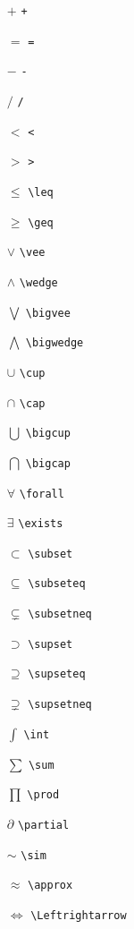 \begin{multicols}{3}
\begin{itemize}
\item[$+$] \texttt{+}
\item[$=$] \texttt{=}
\item[$-$] \texttt{-}
\item[$/$] \texttt{/}
\item[$<$] \texttt{<}
\item[$>$] \texttt{>}
\item[$\leq$] \texttt{\textbackslash leq}
\item[$\geq $] \texttt{\textbackslash geq}
\item[$\vee$] \texttt{\textbackslash vee}
\item[$\wedge$] \texttt{\textbackslash wedge}
\item[$\bigvee$] \texttt{\textbackslash bigvee}
\item[$\bigwedge$] \texttt{\textbackslash bigwedge}
\item[$\cup$] \texttt{\textbackslash cup}
\item[$\cap$] \texttt{\textbackslash cap}
\item[$\bigcup$] \texttt{\textbackslash bigcup}
\item[$\bigcap$] \texttt{\textbackslash bigcap}
\item[$\forall$] \texttt{\textbackslash forall}
\item[$\exists$] \texttt{\textbackslash exists}
\item[$\subset$] \texttt{\textbackslash subset}
\item[$\subseteq$] \texttt{\textbackslash subseteq}
\item[$\subsetneq$] \texttt{\textbackslash subsetneq}
\item[$\supset$] \texttt{\textbackslash supset}
\item[$\supseteq$] \texttt{\textbackslash supseteq}
\item[$\supsetneq$] \texttt{\textbackslash supsetneq}
\item[$\int$] \texttt{\textbackslash int}
\item[$\sum$] \texttt{\textbackslash sum}
\item[$\prod$] \texttt{\textbackslash prod}
\item[$\partial$] \texttt{\textbackslash partial}
\item[$\sim$] \texttt{\textbackslash sim}
\item[$\approx$] \texttt{\textbackslash approx}
\item[$\Leftrightarrow$] \texttt{\textbackslash Leftrightarrow}

\end{itemize}
\end{multicols}
